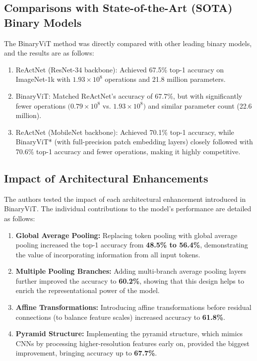 \documentclass{report}
\begin{document}
	
	
	\subsection{Comparisons with State-of-the-Art (SOTA) Binary Models}
	The BinaryViT method was directly compared with other leading binary models, and the results are as follows:
	
	\begin{enumerate}
		\item 
		ReActNet (ResNet-34 backbone): Achieved 67.5\% top-1 accuracy on ImageNet-1k with $1.93 \times 10^8$ operations and 21.8 million parameters.
		
		\item 
		BinaryViT: Matched ReActNet’s accuracy of 67.7\%, but with significantly fewer operations $(0.79 \times 10^8$ vs. $1.93 \times 10^8)$ and similar parameter count (22.6 million).
		
		\item 
		ReActNet (MobileNet backbone): Achieved 70.1\% top-1 accuracy, while BinaryViT* (with full-precision patch embedding layers) closely followed with 70.6\% top-1 accuracy and fewer operations, making it highly competitive.
	\end{enumerate}
	
	
	
	\subsection{Impact of Architectural Enhancements}
	The authors tested the impact of each architectural enhancement introduced in BinaryViT. The individual contributions to the model’s performance are detailed as follows:
	
	\begin{enumerate}
		\item 
		\textbf{Global Average Pooling:} Replacing token pooling with global average pooling increased the top-1 accuracy from \textbf{48.5\% to 56.4\%}, demonstrating the value of incorporating information from all input tokens.
		
		\item 
		\textbf{Multiple Pooling Branches:} Adding multi-branch average pooling layers further improved the accuracy to \textbf{60.2\%}, showing that this design helps to enrich the representational power of the model.
		
		\item 
		\textbf{Affine Transformations:} Introducing affine transformations before residual connections (to balance feature scales) increased accuracy to \textbf{61.8\%}.
		
		\item 
		\textbf{Pyramid Structure:} Implementing the pyramid structure, which mimics CNNs by processing higher-resolution features early on, provided the biggest improvement, bringing accuracy up to \textbf{67.7\%}.
	\end{enumerate}
	
\end{document}

